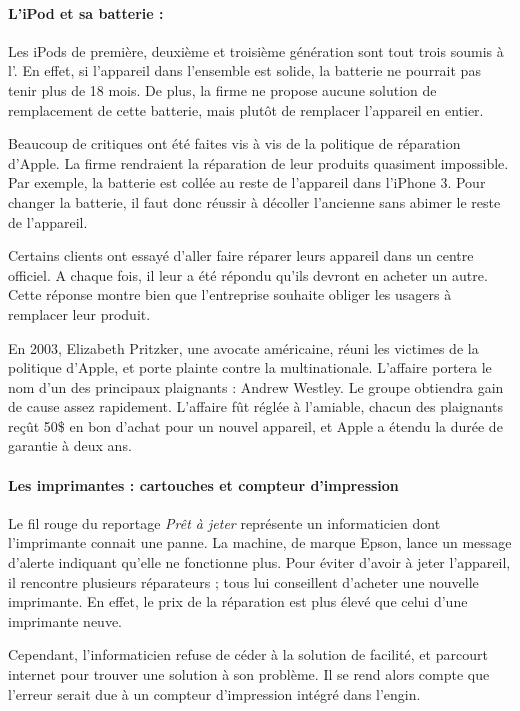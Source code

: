 \paragraph*{L'iPod et sa batterie : } Les iPods de première, deuxième et troisième génération sont tout trois soumis à l'\op. En effet, si l'appareil dans l'ensemble est solide, la batterie ne pourrait pas tenir plus de 18 mois\cite{cec-zevRapportObsProg}. De plus, la firme ne propose aucune solution de remplacement de cette batterie, mais plutôt de remplacer l'appareil en entier. 

\smallbreak 

Beaucoup de critiques ont été faites vis à vis de la politique de réparation d'Apple. La firme  rendraient la réparation de leur produits quasiment impossible. Par exemple, la batterie est collée au reste de l'appareil dans l'iPhone 3. Pour changer la batterie, il faut donc réussir à décoller l'ancienne sans abimer le reste de l'appareil.  

Certains clients ont essayé d'aller faire réparer leurs appareil dans un centre officiel. A chaque fois, il leur a été répondu qu'ils devront en acheter un autre. Cette réponse montre bien que l'entreprise souhaite obliger les usagers à remplacer leur produit. 

\smallbreak


En 2003, Elizabeth Pritzker, une avocate américaine, réuni les victimes de la politique d'Apple, et porte plainte contre la multinationale. L'affaire portera le nom d'un des principaux plaignants : Andrew Westley. Le groupe obtiendra gain de cause assez rapidement. L'affaire fût réglée à l'amiable, chacun des plaignants reçût 50\$ en bon d'achat pour un nouvel appareil, et Apple a étendu la durée de garantie à deux ans. 

\paragraph*{Les imprimantes : cartouches et compteur d'impression}

Le fil rouge du reportage \textit{Prêt à jeter} représente un informaticien dont l'imprimante connait une panne. La machine, de marque Epson, lance un message d'alerte indiquant qu'elle ne fonctionne plus. Pour éviter d'avoir à jeter l'appareil, il rencontre plusieurs réparateurs ; tous lui conseillent d'acheter une nouvelle imprimante. En effet, le prix de la réparation est plus élevé que celui d'une imprimante neuve. 

Cependant, l'informaticien refuse de céder à la solution de facilité, et parcourt internet pour trouver une solution à son problème. Il se rend alors compte que l'erreur serait due à un compteur d'impression intégré dans l'engin. 

